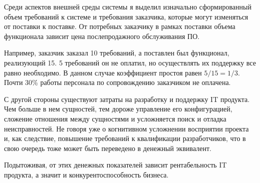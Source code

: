 
Среди аспектов внешней среды системы я выделил изначально сформированный объем требований к системе и требования заказчика, которые могут изменяться от поставки к поставке. От потребных заказчику в рамках поставки объема функционала зависит цена послепродажного обслуживания ПО.

Например, заказчик заказал 10 требований, а поставлен был функционал, реализующий 15. 5 требований он не оплатил, но осуществлять их поддержку все равно необходимо. В данном случае коэффициент простоя равен $5 / 15 = 1/3$. Почти 30\% работы персонала по сопровождению заказчиком не оплачена.

С другой стороны существуют затраты на разработку и поддержку IT продукта. Чем больше в нем сущностей, тем дороже управление его конфигурацией, сложение отношения между сущностями и усложняется поиск и отладка неисправностей. Не говоря уже о когнитивном усложнении восприятии проекта и, как следствие, повышение требований к квалификации разработчиков, что в свою очередь тоже может быть переведено в денежный эквивалент.

Подытоживая, от этих денежных показателей зависит рентабельность IT продукта, а значит и конкурентоспособность бизнеса.